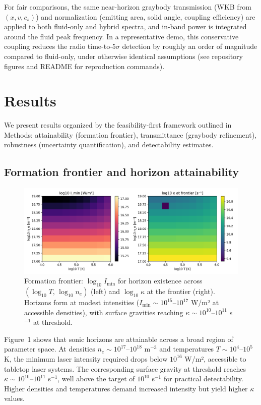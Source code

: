 \documentclass[11pt]{article}
\begin{document}
For fair comparisons, the same near-horizon graybody transmission (WKB from $(x,v,c_s)$) and normalization (emitting area, solid angle, coupling efficiency) are applied to both fluid-only and hybrid spectra, and in-band power is integrated around the fluid peak frequency. In a representative demo, this conservative coupling reduces the radio time-to-$5\sigma$ detection by roughly an order of magnitude compared to fluid-only, under otherwise identical assumptions (see repository figures and README for reproduction commands).

\section{Results}
We present results organized by the feasibility-first framework outlined in Methods: attainability (formation frontier), transmittance (graybody refinement), robustness (uncertainty quantification), and detectability estimates.

\subsection{Formation frontier and horizon attainability}
\begin{figure}[h]
  \centering
  \includegraphics[width=0.95\linewidth]{figures/formation_frontier.png}
  \caption{Formation frontier: $\log_{10} I_{\min}$ for horizon existence across $(\log_{10} T,\, \log_{10} n_e)$ (left) and $\log_{10} \kappa$ at the frontier (right). Horizons form at modest intensities ($I_{\min} \sim 10^{15}$--$10^{17}$ W/m² at accessible densities), with surface gravities reaching $\kappa \sim 10^{10}$--$10^{11}$ s$^{-1}$ at threshold.}
\end{figure}

Figure~1 shows that sonic horizons are attainable across a broad region of parameter space. At densities $n_e \sim 10^{17}$--$10^{18}$ m$^{-3}$ and temperatures $T \sim 10^4$--$10^5$ K, the minimum laser intensity required drops below $10^{16}$ W/m², accessible to tabletop laser systems. The corresponding surface gravity at threshold reaches $\kappa \sim 10^{10}$--$10^{11}$ s$^{-1}$, well above the target of $10^{10}$ s$^{-1}$ for practical detectability. Higher densities and temperatures demand increased intensity but yield higher $\kappa$ values.
\end{document}
